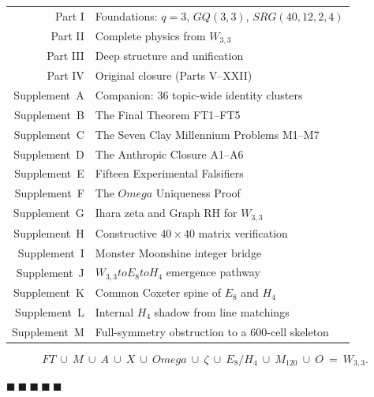 \documentclass[12pt,a4paper]{article}
\def\mathrm#1{#1}%
\def\mathcal#1{#1}%
\def\textbf#1{#1}%
\def\Omega{Omega}%
\def\to{ to }%
\theoremstyle{definition}
\newcommand{\SRG}{\mathrm{SRG}}
\newcommand{\GQ}{\mathrm{GQ}}
\begin{document}
\begin{center}
\renewcommand{\arraystretch}{1.2}
\begin{tabular}{rl}
\textbf{Part I}          & Foundations: $q=3$, $\GQ(3,3)$, $\SRG(40,12,2,4)$ \\
\textbf{Part II}         & Complete physics from $W_{3,3}$ \\
\textbf{Part III}        & Deep structure and unification \\
\textbf{Part IV}         & Original closure (Parts V--XXII) \\
\textbf{Supplement~A}    & Companion: 36 topic-wide identity clusters \\
\textbf{Supplement~B}    & The Final Theorem FT1--FT5 \\
\textbf{Supplement~C}    & The Seven Clay Millennium Problems M1--M7 \\
\textbf{Supplement~D}    & The Anthropic Closure A1--A6 \\
\textbf{Supplement~E}    & Fifteen Experimental Falsifiers \\
\textbf{Supplement~F}    & The $\Omega$ Uniqueness Proof \\
\textbf{Supplement~G}    & Ihara zeta and Graph RH for $W_{3,3}$ \\
\textbf{Supplement~H}    & Constructive $40\times 40$ matrix verification \\
\textbf{Supplement~I}    & Monster Moonshine integer bridge \\
\textbf{Supplement~J}    & $W_{3,3}\to E_8\to H_4$ emergence pathway \\
\textbf{Supplement~K}    & Common Coxeter spine of $E_8$ and $H_4$ \\
\textbf{Supplement~L}    & Internal $H_4$ shadow from line matchings \\
\textbf{Supplement~M}    & Full-symmetry obstruction to a $600$-cell skeleton \\
\end{tabular}
\end{center}

\[
\mathrm{FT}\ \cup\ \mathrm{M}\ \cup\ \mathrm{A}\ \cup\ \mathrm{X}\ \cup\ \Omega
\ \cup\ \zeta\ \cup\ E_8/H_4\ \cup\ \mathcal{M}_{120}\ \cup\ \mathcal{O}\ =\ W_{3,3}.
\]

\hfill $\blacksquare\ \blacksquare\ \blacksquare\ \blacksquare\ \blacksquare$

\clearpage
\end{document}
